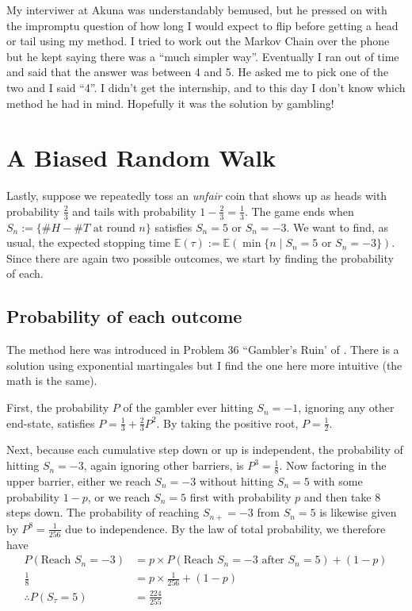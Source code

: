 \documentclass[11pt]{article}
\newcommand{\E}{\mathbb{E}}
\begin{document}
My interviwer at Akuna was understandably bemused, but he pressed on with the impromptu question of how long I would expect to flip before getting a head or tail using my method. I tried to work out the Markov Chain over the phone but he kept saying there was a ``much simpler way''. Eventually I ran out of time and said that the answer was between 4 and 5. He asked me to pick one of the two and I said ``4''. I didn't get the internship, and to this day I don't know which method he had in mind. Hopefully it was the solution by gambling!

\section{A Biased Random Walk}
Lastly, suppose we repeatedly toss an \emph{unfair} coin that shows up as heads with probability $\frac{2}{3}$ and tails with probability $1 - \frac{2}{3} = \frac{1}{3}$. The game ends when $S_n := \{\#H - \#T\text{ at round }n\}$ satisfies $S_n = 5$ or $S_n = -3$. We want to find, as usual, the expected stopping time $\E(\tau) := \E(\min\{n\mid S_n = 5 \text{ or } S_n = -3\})$. Since there are again two possible outcomes, we start by finding the probability of each.

\subsection{Probability of each outcome}
The method here was introduced in Problem 36 ``Gambler's Ruin' of \cite{mosteller1987fifty}. There is a solution using exponential martingales but I find the one here more intuitive (the math is the same).

First, the probability $P$ of the gambler ever hitting $S_n = -1$, ignoring any other end-state, satisfies $P = \frac{1}{3} + \frac{2}{3}P^2$.
By taking the positive root, $P = \frac{1}{2}$.

Next, because each cumulative step down or up is independent, the probability of hitting $S_n = -3$, again ignoring other barriers, is $P^3 = \frac{1}{8}$. Now factoring in the upper barrier, either we reach $S_n = -3$ without hitting $S_n = 5$ with some probability $1-p$, or we reach $S_n = 5$ first with probability $p$ and then take 8 steps down. The probability of reaching $S_{n+} = -3$ from $S_n = 5$ is likewise given by $P^8 = \frac{1}{256}$ due to independence. By the law of total probability, we therefore have
\begin{align*}
P(\text{Reach $S_n = -3$}) &= p \times P(\text{Reach $S_n = -3$ after $S_n = 5$}) + (1-p) \\
\frac{1}{8} &= p\times\frac{1}{256} + (1-p) \\
\therefore P(S_\tau=5) &= \frac{224}{255}
\end{align*}
\end{document}
